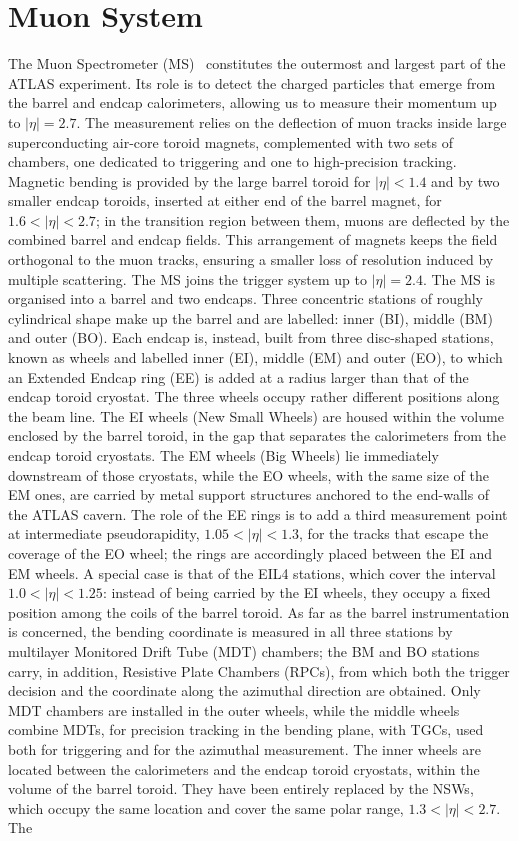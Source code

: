 \documentclass[11pt,a4paper,twoside,openright]{report}
\begin{document}
\section{Muon System}
The Muon Spectrometer (MS)~\cite{ATLASdesc} constitutes the outermost and largest part of the ATLAS experiment. Its role is to detect the charged particles that emerge from the barrel and endcap calorimeters, allowing us to measure their momentum up to \(|\eta| = 2.7\). The measurement relies on the deflection of muon tracks inside large superconducting air-core toroid magnets, complemented with two sets of chambers, one dedicated to triggering and one to high-precision tracking. Magnetic bending is provided by the large barrel toroid for \(|\eta| < 1.4\) and by two smaller endcap toroids, inserted at either end of the barrel magnet, for \(1.6 < |\eta| < 2.7\); in the transition region between them, muons are deflected by the combined barrel and endcap fields. This arrangement of magnets keeps the field orthogonal to the muon tracks, ensuring a smaller loss of resolution induced by multiple scattering. The MS joins the trigger system up to \(|\eta| = 2.4\). The MS is organised into a barrel and two endcaps. Three concentric stations of roughly cylindrical shape make up the barrel and are labelled: inner (BI), middle (BM) and outer (BO). Each endcap is, instead, built from three disc-shaped stations, known as wheels and labelled inner (EI), middle (EM) and outer (EO), to which an Extended Endcap ring (EE) is added at a radius larger than that of the endcap toroid cryostat. The three wheels occupy rather different positions along the beam line. The EI wheels (New Small Wheels) are housed within the volume enclosed by the barrel toroid, in the gap that separates the calorimeters from the endcap toroid cryostats. The EM wheels (Big Wheels) lie immediately downstream of those cryostats, while the EO wheels, with the same size of the EM ones, are carried by metal support structures anchored to the end-walls of the ATLAS cavern. The role of the EE rings is to add a third measurement point at intermediate pseudorapidity, \(1.05 < |\eta| < 1.3\), for the tracks that escape the coverage of the EO wheel; the rings are accordingly placed between the EI and EM wheels. A special case is that of the EIL4 stations, which cover the interval \(1.0 < |\eta| < 1.25\): instead of being carried by the EI wheels, they occupy a fixed position among the coils of the barrel toroid. As far as the barrel instrumentation is concerned, the bending coordinate is measured in all three stations by multilayer Monitored Drift Tube (MDT) chambers; the BM and BO stations carry, in addition, Resistive Plate Chambers (RPCs), from which both the trigger decision and the coordinate along the azimuthal direction are obtained. Only MDT chambers are installed in the outer wheels, while the middle wheels combine MDTs, for precision tracking in the bending plane, with TGCs, used both for triggering and for the azimuthal measurement. The inner wheels are located between the calorimeters and the endcap toroid cryostats, within the volume of the barrel toroid. They have been entirely replaced by the NSWs, which occupy the same location and cover the same polar range, \(1.3 < |\eta| < 2.7\). The 
\end{document}

